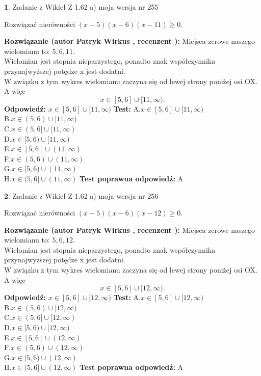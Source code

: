 \documentclass[12pt, a4paper]{article}
\theoremstyle{definition} %
\newtheorem{zad}{}
\newcommand{\zadStart}[1]{\begin{zad}#1\newline}
\newcommand{\zadStop}{\end{zad}}
\newcommand{\rozwStart}[2]{\noindent \textbf{Rozwiązanie (autor #1 , recenzent #2): }\newline}
\newcommand{\rozwStop}{\newline}
\newcommand{\odpStart}{\noindent \textbf{Odpowiedź:}\newline}
\newcommand{\odpStop}{\newline}
\newcommand{\testStart}{\noindent \textbf{Test:}\newline}
\newcommand{\testStop}{\newline}
\newcommand{\kluczStart}{\noindent \textbf{Test poprawna odpowiedź:}\newline}
\newcommand{\kluczStop}{\newline}
\begin{document}
\zadStart{Zadanie z Wikieł Z 1.62 a) moja wersja nr 255}

Rozwiązać nierówności $(x-5)(x-6)(x-11)\ge0$.
\zadStop
\rozwStart{Patryk Wirkus}{}
Miejsca zerowe naszego wielomianu to: $5, 6, 11$.\\
Wielomian jest stopnia nieparzystego, ponadto znak współczynnika przy\linebreak najwyższej potędze x jest dodatni.\\ W związku z tym wykres wielomianu zaczyna się od lewej strony poniżej osi OX. A więc $$x \in [5,6] \cup [11,\infty).$$
\rozwStop
\odpStart
$x \in [5,6] \cup [11,\infty)$
\odpStop
\testStart
A.$x \in [5,6] \cup [11,\infty)$\\
B.$x \in (5,6) \cup [11,\infty)$\\
C.$x \in (5,6] \cup [11,\infty)$\\
D.$x \in [5,6) \cup [11,\infty)$\\
E.$x \in [5,6] \cup (11,\infty)$\\
F.$x \in (5,6) \cup (11,\infty)$\\
G.$x \in [5,6) \cup (11,\infty)$\\
H.$x \in (5,6] \cup (11,\infty)$
\testStop
\kluczStart
A
\kluczStop



\zadStart{Zadanie z Wikieł Z 1.62 a) moja wersja nr 256}

Rozwiązać nierówności $(x-5)(x-6)(x-12)\ge0$.
\zadStop
\rozwStart{Patryk Wirkus}{}
Miejsca zerowe naszego wielomianu to: $5, 6, 12$.\\
Wielomian jest stopnia nieparzystego, ponadto znak współczynnika przy\linebreak najwyższej potędze x jest dodatni.\\ W związku z tym wykres wielomianu zaczyna się od lewej strony poniżej osi OX. A więc $$x \in [5,6] \cup [12,\infty).$$
\rozwStop
\odpStart
$x \in [5,6] \cup [12,\infty)$
\odpStop
\testStart
A.$x \in [5,6] \cup [12,\infty)$\\
B.$x \in (5,6) \cup [12,\infty)$\\
C.$x \in (5,6] \cup [12,\infty)$\\
D.$x \in [5,6) \cup [12,\infty)$\\
E.$x \in [5,6] \cup (12,\infty)$\\
F.$x \in (5,6) \cup (12,\infty)$\\
G.$x \in [5,6) \cup (12,\infty)$\\
H.$x \in (5,6] \cup (12,\infty)$
\testStop
\kluczStart
A
\kluczStop
\end{document}
